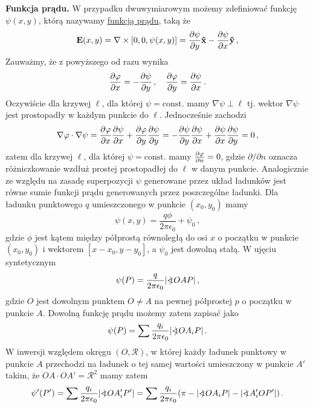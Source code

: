 \documentclass[../main.tex]{subfiles}
\begin{document}
\textbf{Funkcja prądu.} W przypadku dwuwymiarowym możemy zdefiniować funkcję \(\psi(x,y)\), którą nazywamy \underline{funkcją prądu}, taką że
\begin{equation*}
    \mathbf{E}(x,y)=\nabla\times[0,0,\psi(x,y)]=\pdv{\psi}{y}\mathbf{\hat{x}}-\pdv{\psi}{x}\mathbf{\hat{y}}\,,
\end{equation*}
Zauważmy, że z powyższego od razu wynika
\begin{equation*}
    \pdv{\varphi}{x}=-\pdv{\psi}{y}\,,\quad\pdv{\varphi}{y}=\pdv{\psi}{x}\,.
\end{equation*}
Oczywiście dla krzywej \(\ell\), dla której \(\psi=\text{const.}\) mamy \(\nabla\psi\perp\ell\) tj. wektor \(\nabla\psi\) jest prostopadły w każdym punkcie do \(\ell\). Jednocześnie zachodzi
\begin{equation*}
    \nabla\varphi\cdot\nabla\psi=\pdv{\varphi}{x}\pdv{\psi}{x}+\pdv{\varphi}{y}\pdv{\psi}{y}=-\pdv{\psi}{y}\pdv{\psi}{x}+\pdv{\psi}{x}\pdv{\psi}{y}=0\,,
\end{equation*}
zatem dla krzywej \(\ell\), dla której \(\psi=\text{const.}\) mamy \(\pdv{\varphi}{n}=0\), gdzie \(\partial/\partial n\) oznacza różniczkowanie wzdłuż prostej prostopadłej do \(\ell\) w danym punkcie. Analogicznie ze względu na zasadę superpozycji \(\psi\) generowane przez układ ładunków jest równe sumie funkcji prądu generowanych przez poszczególne ładunki. Dla ładunku punktowego \(q\) umieszczonego w punkcie \((x_0,y_0)\) mamy
\begin{equation*}
   \psi(x,y)=\frac{q\phi}{2\pi\epsilon_0}+\psi_0\,,
\end{equation*}
gdzie \(\phi\) jest kątem między półprostą równoległą do osi \(x\) o początku w punkcie \((x_0,y_0)\) i wektorem \([x-x_0,y-y_0]\), a \(\psi_0\) jest dowolną stałą. W ujęciu syntetycznym
\begin{equation*}
    \psi(P)=\frac{q}{2\pi\epsilon_0}|\mathord{<\mspace{-9mu}\mathrel{)}\mspace{2mu}} OAP|\,,
\end{equation*}
gdzie \(O\) jest dowolnym punktem \(O\neq A\) na pewnej półprostej \(p\) o początku w punkcie \(A\). Dowolną funkcję prądu możemy zatem zapisać jako
\begin{equation*}
    \psi(P)=\sum\frac{q_i}{2\pi\epsilon_0}|\mathord{<\mspace{-9mu}\mathrel{)}\mspace{2mu}} OA_iP|\,.
\end{equation*}
W inwersji względem okręgu \((O,\mathscr{R})\), w której każdy ładunek punktowy w punkcie \(A\) przechodzi na ładunek o tej samej wartości umieszczony w punkcie \(A'\) takim, że \(OA\cdot OA'=\mathscr{R}^2\) mamy zatem
\begin{equation*}
    \psi'(P')=\sum\frac{q_i}{2\pi\epsilon_0}|\mathord{<\mspace{-9mu}\mathrel{)}\mspace{2mu}} OA_i'P'|=\sum\frac{q_i}{2\pi\epsilon_0}(\pi-|\mathord{<\mspace{-9mu}\mathrel{)}\mspace{2mu}} OA_iP|-|\mathord{<\mspace{-9mu}\mathrel{)}\mspace{2mu}} A_i'OP'|)\,.
\end{equation*}
\end{document}
